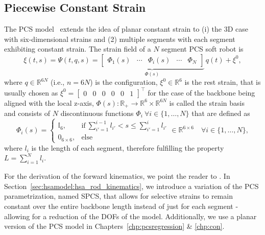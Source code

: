 \subsection{Piecewise Constant Strain}
The \gls{PCS} model~\citep{renda2016discrete, renda2018discrete} extends the idea of planar constant strain to (i) the 3D case with six-dimensional strains and (2) multiple segments with each segment exhibiting constant strain. 
The strain field of a $N$ segment \gls{PCS} soft robot is
\begin{equation}
    \xi(t,s) = \Psi(t,q,s) = \underbrace{\begin{bmatrix}
        \Phi_1(s) & \cdots & \Phi_i(s) & \cdots & \Phi_N
    \end{bmatrix}}_{\Phi(s)} \, q(t) + \xi^0,
\end{equation}
where $q \in \mathbb{R}^{6N}$ (i.e., $n=6N$) is the configuration,
$\xi^0 \in \mathbb{R}^6$ is the rest strain, that is usually chosen as $\xi^0 = \begin{bmatrix}
    0 & 0 & 0 & 0 & 0 & 1
\end{bmatrix}^\top$ for the case of the backbone being aligned with the local z-axis,
$\Phi(s): \mathbb{R_+} \to \mathbb{R}^6 \times \mathbb{R}^{6N}$ is called the strain basis~\citep{renda2020geometric, mathew2025reduced} and consists of
$N$ discontinuous functions $\Phi_i \: \forall i \in \{ 1,\dots, N \}$ that are defined as
\begin{equation}
    \Phi_i(s) = \begin{cases}
        \mathbb{I}_{6}, & \text{if} \: \sum_{i'=1}^{i-1} l_{i'} < s \leq \sum_{i'= 1}^{i} l_{i'} \\
        0_{6\times 6}, & \text{else}
    \end{cases} \in \mathbb{R}^{6 \times 6} \quad \forall i \in \{ 1,\dots, N \},
\end{equation}
where $l_i$ is the length of each segment, therefore fulfilling the property $L = \sum_{i=1}^{N} l_i$.

For the derivation of the forward kinematics, we point the reader to \citet{renda2018discrete}. In Section~\ref{sec:hsamodel:hsa_rod_kinematics}, we introduce a variation of the \gls{PCS} parametrization, named \gls{SPCS}, that allows for selective strains to remain constant over the entire backbone length instead of just for each segment - allowing for a reduction of the \glspl{DOF} of the model.
Additionally, we use a planar version of the \gls{PCS} model in Chapters~\ref{chp:pcsregression} \& \ref{chp:con}.


